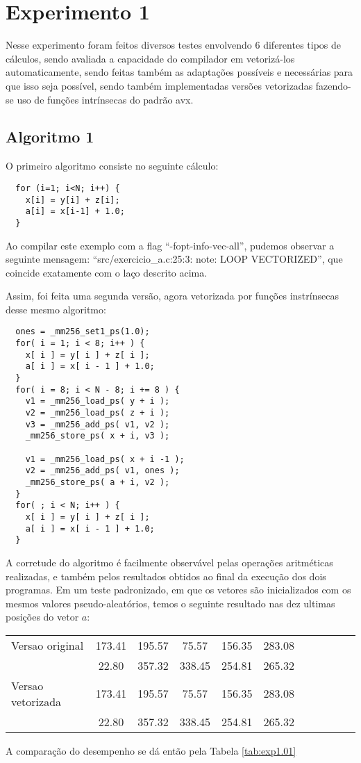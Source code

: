 \documentclass[conference]{IEEEtran}
\begin{document}
\section{Experimento 1}
Nesse experimento foram feitos diversos testes envolvendo 6 diferentes tipos de cálculos, sendo avaliada a capacidade do compilador em vetorizá-los automaticamente, sendo feitas também as adaptações possíveis e necessárias para que isso seja possível, sendo também implementadas versões vetorizadas fazendo-se uso de funções intrínsecas do padrão avx.

\subsection{Algoritmo 1}
O primeiro algoritmo consiste no seguinte cálculo:

\begin{lstlisting}
  for (i=1; i<N; i++) {
    x[i] = y[i] + z[i];
    a[i] = x[i-1] + 1.0;
  }
\end{lstlisting}

Ao compilar este exemplo com a flag ``-fopt-info-vec-all'', pudemos observar a seguinte mensagem: ``src/exercicio\_a.c:25:3: note: LOOP VECTORIZED'', que coincide exatamente com o laço descrito acima.

Assim, foi feita uma segunda versão, agora vetorizada por funções instrínsecas desse mesmo algoritmo:

\begin{lstlisting}
  ones = _mm256_set1_ps(1.0);
  for( i = 1; i < 8; i++ ) {
    x[ i ] = y[ i ] + z[ i ];
    a[ i ] = x[ i - 1 ] + 1.0;
  }
  for( i = 8; i < N - 8; i += 8 ) {
    v1 = _mm256_load_ps( y + i );
    v2 = _mm256_load_ps( z + i );
    v3 = _mm256_add_ps( v1, v2 );
    _mm256_store_ps( x + i, v3 );

    v1 = _mm256_load_ps( x + i -1 );
    v2 = _mm256_add_ps( v1, ones );
    _mm256_store_ps( a + i, v2 );
  }
  for( ; i < N; i++ ) {
    x[ i ] = y[ i ] + z[ i ];
    a[ i ] = x[ i - 1 ] + 1.0;
  }
\end{lstlisting}

A corretude do algoritmo é facilmente observável pelas operações aritméticas realizadas, e também pelos resultados obtidos ao final da execução dos dois programas.
Em um teste padronizado, em que os vetores são inicializados com os mesmos valores pseudo-aleatórios, temos o seguinte resultado nas dez ultimas posições do vetor $a$: \cite{wiki:BLAS}

\begin{table}[htb!]
\centering
\begin{tabular}{ l c c c c c c c c c c }
  Versao original & 173.41 & 195.57 & 75.57 & 156.35 & 283.08 \\
  & 22.80 & 357.32 & 338.45 & 254.81 & 265.32\\
  Versao vetorizada & 173.41 & 195.57 & 75.57 & 156.35 & 283.08 \\
  & 22.80 & 357.32 & 338.45 & 254.81 & 265.32\\
\end{tabular}
\end{table}
A comparação do desempenho se dá então pela Tabela \ref{tab:exp1.01}
\end{document}
